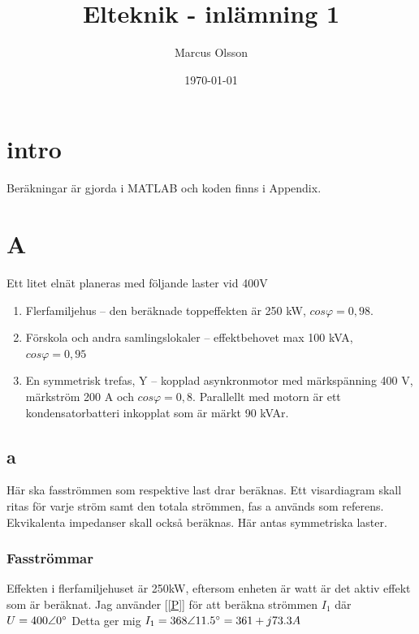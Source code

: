 \documentclass{article}
\title{Elteknik - inlämning 1} %
\author{
	\begin{tabular}{l r}
    Marcus Olsson \\
    \\
    \end{tabular}
    }
\date{\today} %
\begin{document}
\maketitle %
\tableofcontents
\clearpage
\section{intro}
Beräkningar är gjorda i MATLAB och koden finns i Appendix.

\section{A}
Ett litet elnät planeras med följande laster vid 400V

\begin{enumerate}
	\item Flerfamiljehus – den beräknade toppeffekten är 250 kW, $cos\varphi = 0,98$.
	\item Förskola och andra samlingslokaler – effektbehovet max 100 kVA, $cos\varphi = 0,95$
	\item En symmetrisk trefas, Y – kopplad asynkronmotor med märkspänning 400 V,
märkström 200 A och $cos\varphi = 0,8$. Parallellt med motorn är ett kondensatorbatteri
inkopplat som är märkt 90 kVAr.
\end{enumerate}

\subsection{a}
Här ska fasströmmen som respektive last drar beräknas.
Ett visardiagram skall ritas för varje ström samt den totala strömmen, fas a används som referens.
Ekvikalenta impedanser skall också beräknas.
Här antas symmetriska laster.

  \subsubsection{Fasströmmar}
  Effekten i flerfamiljehuset är 250kW, eftersom enheten är watt är det aktiv effekt som är beräknat.
  Jag använder [\ref{P}] för att beräkna strömmen $I_1$ där $U=400\angle{0\degree}$
  Detta ger mig $I_1=368\angle{11.5\degree}=361+j73.3 A$
\end{document}
